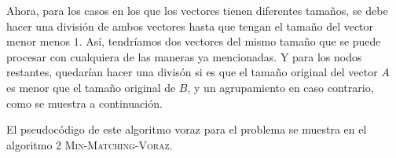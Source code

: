 \documentclass[conference]{IEEEtran}
\begin{document}
Ahora, para los casos en los que los vectores tienen diferentes tamaños, se debe hacer una división de ambos vectores hasta que tengan el tamaño del vector menor menos $1$. Así, tendríamos dos vectores del mismo tamaño que se puede procesar con cualquiera de las maneras ya mencionadas. Y para los nodos restantes, quedarían hacer una divisón si es que el tamaño original del vector $A$ es menor que el tamaño original de $B$, y un agrupamiento en caso contrario, como se muestra a continuación.\\
\begin{center}
\end{center}

El pseudocódigo de este algoritmo voraz para el problema se muestra en el algoritmo 2 \textsc{Min-Matching-Voraz}.
\end{document}
